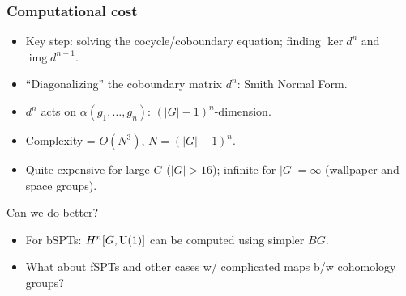 \documentclass[xcolor=table, aspectratio=169,ignorenonframetext]{beamer}
\DeclareMathOperator{\img}{img}
\newcommand{\uone}{\text U(1)}
\begin{document}
\begin{frame}
	\frametitle{Computational cost}
	\begin{itemize}
		\item Key step: solving the cocycle/coboundary equation; finding $\ker d^n$ and $\img d^{n-1}$.
		\item ``Diagonalizing'' the coboundary matrix $d^n$: Smith Normal Form.
		\item $d^n$ acts on $\alpha(g_1,\ldots,g_n)$: $(|G|-1)^n$-dimension.
		\item Complexity = $O(N^3)$, $N = (|G|-1)^n$.
		\item Quite expensive for large $G$ ($|G| > 16$); infinite for $|G|=\infty$ (wallpaper and space groups).
	\end{itemize}
	\begin{block}{Can we do better?}
		\begin{itemize}
			\item For bSPTs: $H^n[G,\uone]$ can be computed using simpler $BG$.
			\item What about fSPTs and other cases w/ complicated maps b/w cohomology groups?
		\end{itemize}
	\end{block}
\end{frame}
\end{document}
